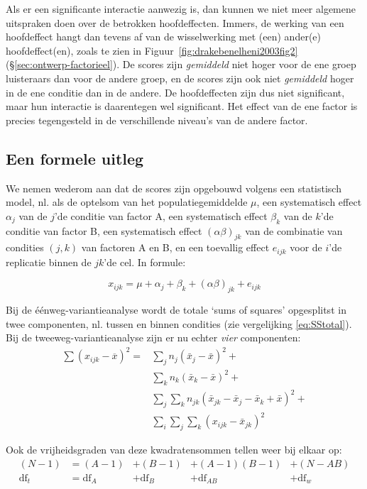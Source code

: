 \documentclass[
]{book}
\begin{document}
Als er een significante interactie aanwezig is, dan kunnen we niet meer
algemene uitspraken doen over de betrokken hoofdeffecten. Immers, de
werking van een hoofdeffect hangt dan tevens af van de wisselwerking met
(een) ander(e) hoofdeffect(en), zoals te zien in
Figuur~\ref{fig:drakebenelheni2003fig2} (§\ref{sec:ontwerp-factorieel}).
De scores zijn \emph{gemiddeld}
niet hoger voor de ene groep luisteraars dan voor de andere groep, en de
scores zijn ook niet \emph{gemiddeld} hoger in de ene conditie dan in de
andere. De hoofdeffecten zijn dus niet significant, maar hun interactie
is daarentegen wel significant. Het effect van de ene factor is precies
tegengesteld in de verschillende niveau's van de andere factor.

\hypertarget{een-formele-uitleg}{%
\subsection{Een formele uitleg}\label{een-formele-uitleg}}

We nemen wederom aan dat de scores zijn opgebouwd volgens een
statistisch model, nl. als de optelsom van het populatiegemiddelde
\(\mu\), een systematisch effect \(\alpha_j\) van de \(j\)'de conditie van
factor A, een systematisch effect \(\beta_k\) van de \(k\)'de conditie van
factor B, een systematisch effect \((\alpha\beta)_{jk}\) van de combinatie
van condities \((j,k)\) van factoren A en B, en een toevallig effect
\(e_{ijk}\) voor de \(i\)'de replicatie binnen de \(jk\)'de cel. In formule:

\[x_{ijk} = \mu + \alpha_{j} + \beta_{k} + (\alpha\beta)_{jk} + e_{ijk}\]

Bij de éénweg-variantieanalyse wordt de totale `sums of squares'
opgesplitst in twee componenten, nl. tussen en binnen condities (zie
vergelijking \eqref{eq:SStotal}).
Bij de tweeweg-variantieanalyse zijn er nu
echter \emph{vier} componenten:
\begin{align}
  \label{eq:SStotal2way}
    { \sum (x_{ijk} - \overline{x})^2 } = &  { \sum_j n_j (\bar{x}_j - \bar{x})^2 } + \\ 
    & { \sum_k n_k (\bar{x}_k - \bar{x})^2 } +  \\
    & { \sum_j \sum_k n_{jk} (\bar{x}_{jk} - \bar{x}_j - \bar{x}_k + \bar{x})^2 } + \\
    & { \sum_i \sum_j \sum_k (x_{ijk} - \bar{x}_{jk})^2 } 
\end{align}

Ook de vrijheidsgraden van deze kwadratensommen tellen weer bij elkaar
op:
\begin{align}
  \label{eq:dftotal2}
    { (N-1) } &= (A-1) &+ (B-1) &+ (A-1)(B-1) &+ (N-AB) \\
    \textrm{df}_t &= \textrm{df}_A &+ \textrm{df}_B &+ \textrm{df}_{AB} &+ \textrm{df}_w
\end{align}
\end{document}

